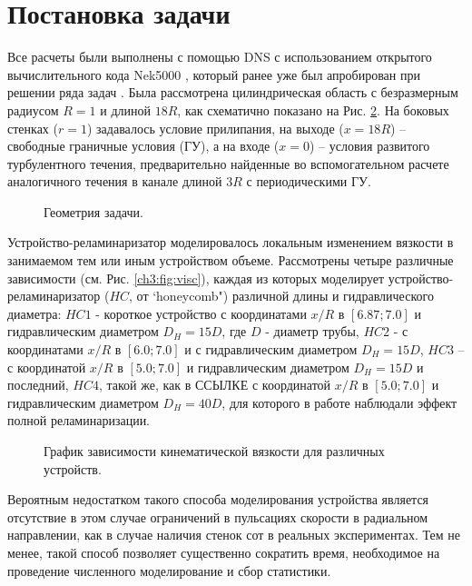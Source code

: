 \section{Постановка задачи}\label{ch3:problem}
%
Все расчеты были выполнены с помощью DNS с использованием открытого вычислительного кода Nek5000 \cite{nek}, 
который ранее уже был апробирован при решении ряда задач 
\cite{zaripov2021mechanism,zaripov2021reverse,ivashchenko2021effect}. 
%
Была рассмотрена цилиндрическая область с безразмерным радиусом $R = 1$ и длиной $18R$, 
как схематично показано на Рис. \ref{ch3:fig:geom}. 
%
На боковых стенках ($r = 1$) задавалось условие прилипания, на выходе ($x = 18R$) -- 
свободные граничные условия (ГУ), а на входе ($x = 0$) -- условия развитого турбулентного течения, 
предварительно найденные во вспомогательном расчете аналогичного течения в канале длиной $3R$ с периодическими ГУ. 
%
\begin{figure}[ht]
    \caption{Геометрия задачи.}\label{ch3:fig:geom}
\end{figure}
%
Устройство-реламинаризатор моделировалось локальным изменением вязкости в 
занимаемом тем или иным устройством объеме. 
%
Рассмотрены четыре различные зависимости (см. Рис. \ref{ch3:fig:visc}), 
каждая из которых моделирует устройство-реламинаризатор ($HC$, от `honeycomb") 
различной длины и гидравлического диаметра: 
$HC1$ - короткое устройство с координатами $x/R$ в $[6.87;7.0]$ и гидравлическим диаметром $D_H = 15D$, 
где $D$ - диаметр трубы, 
$HC2$ - с координатами $x/R$ в $[6.0;7.0]$ и с гидравлическим диаметром $D_H = 15D$, 
$HC3$ -- с координатой $x/R$ в $[5.0;7.0]$ и гидравлическим диаметром $D_H = 15D$ и последний, 
$HC4$, такой же, как в ССЫЛКЕ с координатой $x/R$ в $[5.0;7.0]$ и гидравлическим диаметром $D_H = 40D$, 
для которого в работе \cite{kuhnen2019relaminarization} наблюдали эффект полной реламинаризации.
%
\begin{figure}[ht]
    \caption{График зависимости кинематической вязкости для различных устройств.}\label{ch3:fig:geom}
\end{figure}
%


%
Вероятным недостатком такого способа моделирования устройства является отсутствие
 в этом случае ограничений в пульсациях скорости в радиальном направлении, 
как в случае наличия стенок сот в реальных экспериментах. 
%
Тем не менее, такой способ позволяет существенно сократить время, 
необходимое на проведение численного моделирование и сбор статистики.
%

